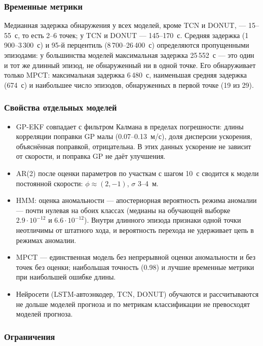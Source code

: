 \documentclass[a4paper,12pt]{report}
\begin{document}
\subsubsection{Временные метрики}

Медианная задержка обнаружения у всех моделей, кроме TCN и DONUT, --- 15--55~с, то есть 2--6 точек; у TCN и DONUT --- 145--170~с. Средняя задержка (1\,900--3\,300~с) и 95-й перцентиль (8\,700--26\,400~с) определяются пропущенными эпизодами: у большинства моделей максимальная задержка 25\,552~с --- это один и тот же длинный эпизод, не обнаруженный ни в одной точке. Его обнаруживает только MPCT: максимальная задержка 6\,480~с, наименьшая средняя задержка (674~с) и наибольшее число эпизодов, обнаруженных в первой точке (19 из 29).

\subsubsection{Свойства отдельных моделей}

\begin{itemize}
	\item GP-EKF совпадает с фильтром Калмана в пределах погрешности: длины корреляции поправки GP малы (0.07--0.13~м/с), доля дисперсии ускорения, объяснённая поправкой, отрицательна. В этих данных ускорение не зависит от скорости, и поправка GP не даёт улучшения.
	\item AR(2) после оценки параметров по участкам с шагом 10~с сводится к модели постоянной скорости: $\phi\approx(2,-1)$, $\sigma$ 3--4~м.
	\item HMM: оценка аномальности --- апостериорная вероятность режима аномалии --- почти нулевая на обоих классах (медианы на обучающей выборке $2.9\cdot10^{-12}$ и $6.6\cdot10^{-12}$). Внутри длинного эпизода признаки одной точки неотличимы от штатного хода, и вероятность перехода не удерживает цепь в режимах аномалии.
	\item MPCT --- единственная модель без непрерывной оценки аномальности и без точек без оценки; наибольшая точность (0.98) и лучшие временные метрики при наибольшей ошибке длины.
	\item Нейросети (LSTM-автоэнкодер, TCN, DONUT) обучаются и рассчитываются не дольше моделей прогноза и по метрикам классификации не превосходят моделей прогноза.
\end{itemize}

\subsubsection{Ограничения}
\end{document}
